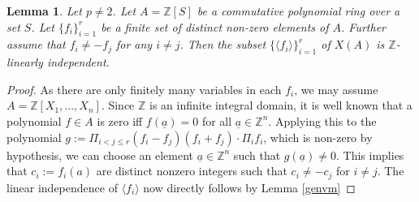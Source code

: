 \documentclass[10pt]{amsart}
\theoremstyle{plain}
\newtheorem{lemma}[thm]{Lemma}
\theoremstyle{definition}
\newcommand{\Z}{{\mathbb Z}}
\newcommand{\ab}[1]{\langle {#1} \rangle}
\begin{document}
\begin{lemma}\label{zindcomm} Let $p\neq 2$.
Let $A = \Z[S]$ be a commutative polynomial ring over a set $S$. Let $\{f_i\}_{i=1}^r$ be a finite set of distinct non-zero elements of $A$. Further assume that $f_i\neq -f_j$ for any $i\neq j$. Then the subset $\{\ab{f_i}\}_{i=1}^r$ of $X(A)$ is $\Z$-linearly independent. 
\end{lemma}
\begin{proof}
As there are only finitely many variables in each $f_i$, we may assume $A=\Z[X_1,...,X_n]$. Since $\Z$ is an infinite integral domain, it is well known that a polynomial $f \in A$ is zero iff $f(\underline{a})=0$ for all $\underline{a}\in \Z^n$. Applying this to the polynomial $g:=\Pi_{i<j\leq r}(f_i-f_j)(f_i+f_j)\cdot \Pi_i f_i$, which is non-zero by hypothesis, we can choose an element $\underline{a}\in \Z^n$ such that $g(\underline{a})\neq 0$. This implies that $c_i:=f_i(a)$ are distinct nonzero integers such that $c_i\neq -c_j$ for $i\neq j$. The linear independence of $\ab{f_i}$ now directly follows by Lemma \ref{genvm}
\end{proof}
\end{document}
